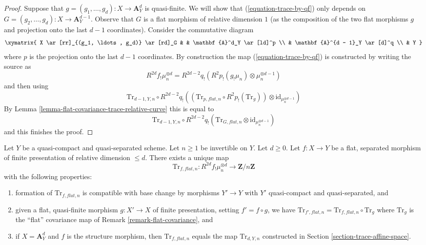 \begin{proof}
\medskip\noindent
Suppose that $g = (g_1, \ldots, g_d) : X \to \mathbf{A}^d_Y$
is quasi-finite. We will show that (\ref{equation-trace-by-qf})
only depends on $G = (g_2, \ldots, g_d) : X \to \mathbf{A}^{d - 1}_Y$.
Observe that $G$ is a flat morphism of relative dimension $1$
(as the composition of the two flat morphisms $g$ and projection onto
the last $d - 1$ coordinates).
Consider the commutative diagram
$$
\xymatrix{
X \ar[rr]_{(g_1, \ldots, g_d)} \ar[rd]_G & & \mathbf{A}^d_Y \ar[ld]^p \\
& \mathbf{A}^{d - 1}_Y \ar[d]^q \\
& Y
}
$$
where $p$ is the projection onto the last $d - 1$ coordinates. 
By construction the map (\ref{equation-trace-by-qf}) is constructed
by writing the source as
$$
R^{2d}f_!\mu_n^{\otimes d} =
R^{2d - 2}q_!(R^2p_!(g_!\mu_n) \otimes \mu_n^{\otimes d - 1})
$$
and then using
$$
\text{Tr}_{d - 1, Y, n}
\circ
R^{2d - 2}q_!\left(
\left(\text{Tr}_{p, \mathit{flat}, n} \circ R^2p_!(\text{Tr}_g)\right)
\otimes \text{id}_{\mu_n^{\otimes d - 1}}\right)
$$
By Lemma \ref{lemma-flat-covariance-trace-relative-curve} this is equal to
$$
\text{Tr}_{d - 1, Y, n}
\circ
R^{2d - 2}q_!\left(\text{Tr}_{G, \mathit{flat}, n} \otimes
\text{id}_{\mu_n^{\otimes d - 1}}\right)
$$
and this finishes the proof.
\end{proof}

\begin{proposition}
\label{proposition-flat-trace-map}
Let $Y$ be a quasi-compact and quasi-separated scheme.
Let $n \geq 1$ be invertible on $Y$. Let $d \geq 0$.
Let $f : X \to Y$ be a flat, separated morphism of finite presentation
of relative dimension $\leq d$. There exists a unique map
$$
\text{Tr}_{f, \mathit{flat}, n} :
R^{2d}f_!\mu_n^{\otimes d}
\longrightarrow
\mathbf{Z}/n\mathbf{Z}
$$
with the following properties:
\begin{enumerate}
\item formation of $\text{Tr}_{f, \mathit{flat}, n}$ is compatible with
base change by morphisms $Y' \to Y$ with
$Y'$ quasi-compact and quasi-separated, and
\item given a flat, quasi-finite morphism $g : X' \to X$ of
finite presentation, setting $f' = f \circ g$, we have
$\text{Tr}_{f', \mathit{flat}, n} =
\text{Tr}_{f, \mathit{flat}, n} \circ \text{Tr}_g$ where
$\text{Tr}_g$ is the ``flat'' covariance map
of Remark \ref{remark-flat-covariance}, and
\item if $X = \mathbf{A}^d_Y$ and $f$ is the structure morphism,
then $\text{Tr}_{f, \mathit{flat}, n}$ equals the map $\text{Tr}_{d, Y, n}$
constructed in Section \ref{section-trace-affine-space}.
\end{enumerate}
\end{proposition}

